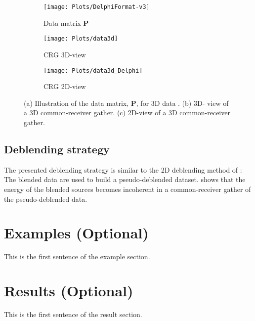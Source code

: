 \documentclass{madrid15WS}
\begin{document}
\begin{figure}[h!]
	
	\centering
	\begin{subfigure}[t]{0.4\textwidth}
		\centering
		\texttt{[image: Plots/DelphiFormat-v3]}
		\caption{Data matrix $\mathbf{P}$}
		\label{fig:DelphiFormat}
	\end{subfigure}
	\qquad  
	\centering
	\begin{subfigure}[t]{0.3\textwidth}
		\centering
		\texttt{[image: Plots/data3d]}
		\caption{CRG 3D-view}
		\label{fig:CRG_3D-view}
	\end{subfigure}
	
	\centering
	\begin{subfigure}[t]{0.8\textwidth}
		\centering
		\texttt{[image: Plots/data3d\_Delphi]}
		\caption{CRG 2D-view}
		\label{fig:CRG_2D-view}
	\end{subfigure}
	
	\caption{(a) Illustration of the data matrix, $\mathbf{P}$, for 3D data \citep{Delphi-Format}. (b) 3D- view of a 3D common-receiver gather. (c) 2D-view of a 3D common-receiver gather.}
	\label{fig:DataSorting}
\end{figure}


\subsection{Deblending strategy}

The presented deblending strategy is similar to the 2D deblending method of \citet{Mahdad-Deblending-Method}: The blended data are used to build a pseudo-deblended dataset. \citet{Mahdad-Deblending-Method} shows that the energy of the blended sources becomes incoherent in a common-receiver gather of the pseudo-deblended data. 

\section{Examples (Optional)}

This is the first sentence of the example section.

\section{Results (Optional)}

This is the first sentence of the result section.

\end{document}
